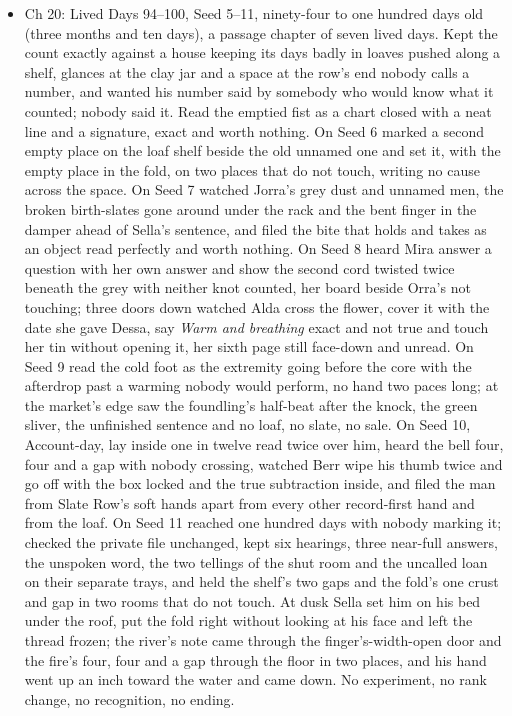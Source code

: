 \documentclass{design/chronicle}
\begin{document}
{\begin{itemize}[leftmargin=1.4em,itemsep=1pt,topsep=3pt,parsep=0pt]
\end{itemize}

\begin{itemize}[leftmargin=1.4em,itemsep=1pt,topsep=3pt,parsep=0pt]

\item Ch 20: Lived Days 94–100, Seed 5–11, ninety-four to one hundred days old (three months and ten days), a passage chapter of seven lived days. Kept the count exactly against a house keeping its days badly in loaves pushed along a shelf, glances at the clay jar and a space at the row’s end nobody calls a number, and wanted his number said by somebody who would know what it counted; nobody said it. Read the emptied fist as a chart closed with a neat line and a signature, exact and worth nothing. On Seed 6 marked a second empty place on the loaf shelf beside the old unnamed one and set it, with the empty place in the fold, on two places that do not touch, writing no cause across the space. On Seed 7 watched Jorra’s grey dust and unnamed men, the broken birth-slates gone around under the rack and the bent finger in the damper ahead of Sella’s sentence, and filed the bite that holds and takes as an object read perfectly and worth nothing. On Seed 8 heard Mira answer a question with her own answer and show the second cord twisted twice beneath the grey with neither knot counted, her board beside Orra’s not touching; three doors down watched Alda cross the flower, cover it with the date she gave Dessa, say \emph{Warm and breathing} exact and not true and touch her tin without opening it, her sixth page still face-down and unread. On Seed 9 read the cold foot as the extremity going before the core with the afterdrop past a warming nobody would perform, no hand two paces long; at the market’s edge saw the foundling’s half-beat after the knock, the green sliver, the unfinished sentence and no loaf, no slate, no sale. On Seed 10, Account-day, lay inside one in twelve read twice over him, heard the bell four, four and a gap with nobody crossing, watched Berr wipe his thumb twice and go off with the box locked and the true subtraction inside, and filed the man from Slate Row’s soft hands apart from every other record-first hand and from the loaf. On Seed 11 reached one hundred days with nobody marking it; checked the private file unchanged, kept six hearings, three near-full answers, the unspoken word, the two tellings of the shut room and the uncalled loan on their separate trays, and held the shelf’s two gaps and the fold’s one crust and gap in two rooms that do not touch. At dusk Sella set him on his bed under the roof, put the fold right without looking at his face and left the thread frozen; the river’s note came through the finger’s-width-open door and the fire’s four, four and a gap through the floor in two places, and his hand went up an inch toward the water and came down. No experiment, no rank change, no recognition, no ending.


\end{itemize}}
\end{document}
